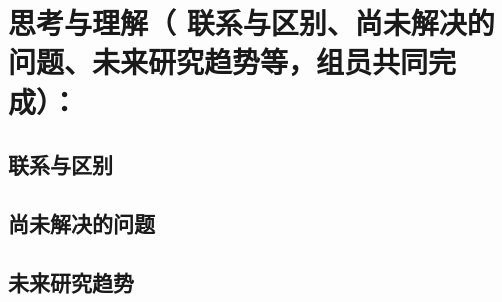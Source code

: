 \documentclass[12pt,AutoFakeBold]{article}
\newcommand{\upcite}[1]{{\textsuperscript{\cite{#1}}}}
\newcommand{\revision}[1]{{\color{blue} #1}}
\begin{document}
\section{思考与理解（\revision{联系与区别、尚未解决的问题、未来研究趋势等，组员共同完成}）：}

\subsection{联系与区别}

\subsection{尚未解决的问题}


\subsection{未来研究趋势}




\newpage
{\small


}
\end{document}
